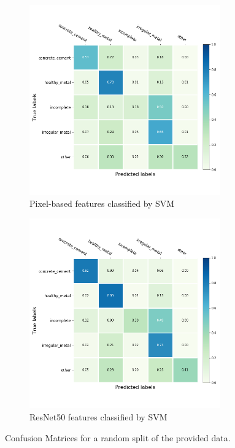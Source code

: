 \documentclass[11pt]{article}
\begin{document}
	\begin{figure}
		\begin{subfigure}[t]{.5\textwidth}
			\centering
			\includegraphics[width=0.9\textwidth]{figures/results/pixel_based_cm.png}
			\caption{Pixel-based features classified by SVM}
		\end{subfigure}
		\begin{subfigure}[t]{.5\textwidth}
			\centering
			\includegraphics[width=0.9\textwidth]{figures/results/nn_based_cm.png}
			\caption{ResNet50 features classified by SVM}
		\end{subfigure}
	\caption{Confusion Matrices for a random split of the provided data.}
	\label{fig:pixel_based_cm}
	\end{figure}
	
\end{document}
